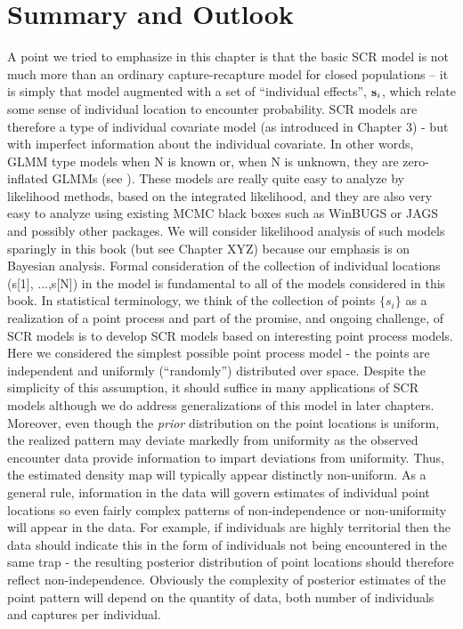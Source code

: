 \section{ Summary and Outlook  }
A point we tried to emphasize in this chapter is that the basic SCR
model is not much more than an ordinary capture-recapture model for
closed populations -- it is simply that model augmented with a set of
``individual effects'', ${\bf s}_{i}$, which relate some sense of individual
location to encounter probability. SCR models are therefore a type of
individual covariate model (as introduced in Chapter 3) - but with
imperfect information about the individual covariate. In other words,
GLMM type models when N is known or, when N is unknown, they are
zero-inflated GLMMs (see \citet{royle:2006}).  These models are really quite easy to analyze by likelihood methods, based on the integrated likelihood, and they are also very easy to analyze using existing MCMC black boxes such as WinBUGS or JAGS and possibly other packages.  We will consider likelihood analysis of such models sparingly in this book (but see Chapter XYZ) because our emphasis is on Bayesian analysis. 
Formal consideration of the collection of individual locations (s[1], ...,s[N]) in the model is fundamental to all of the models considered in this book. In statistical terminology, we think of the collection of points $\{ s_{i} \}$ as a realization of a point process and part of the promise, and ongoing challenge, of SCR models is to develop SCR models based on interesting point process models. Here we considered the simplest possible point process model - the points are independent and uniformly (``randomly'') distributed over space. Despite the simplicity of this assumption, it should suffice in many applications of SCR models although we do address generalizations of this model in later chapters. Moreover, even though the {\it prior} distribution on the point locations is uniform, the realized pattern may deviate markedly from uniformity as the observed encounter data provide information to impart deviations from uniformity. Thus, the estimated density map will typically appear distinctly non-uniform.  As a general rule, information in the data will govern estimates of individual point locations so even fairly complex patterns of non-independence or non-uniformity will appear in the data. For example, if individuals are highly territorial then the data should indicate this in the form of individuals not being encountered in the same trap - the resulting posterior distribution of point locations should therefore reflect non-independence.  Obviously the complexity of posterior estimates of the point pattern will depend on the quantity of data, both number of individuals and captures per individual.
